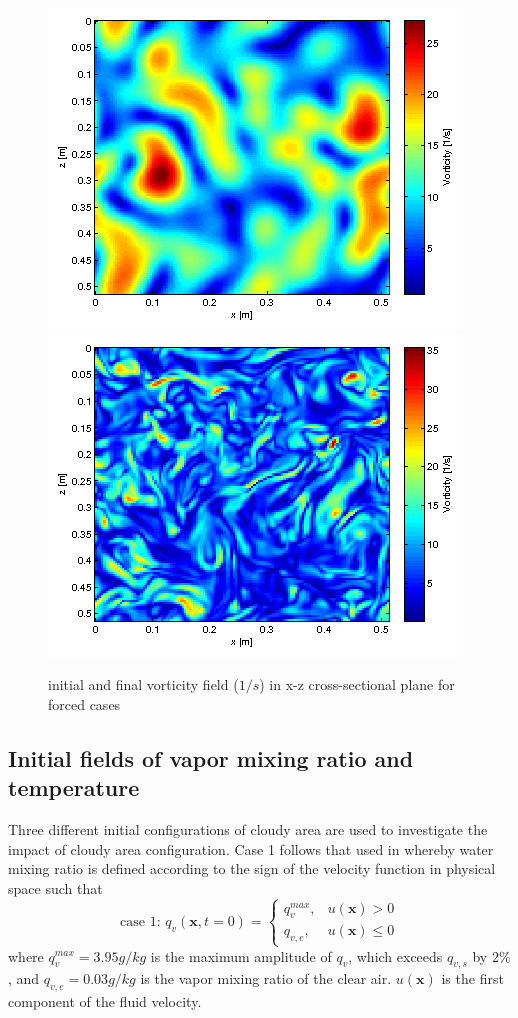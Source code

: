 \documentclass[draft,jgrga]{AGUTeX}
\begin{document}
\begin{article}

\begin{figure}[H]\centering
\includegraphics[width=0.48\linewidth]{Figures/vortex-0}
\includegraphics[width=0.48\linewidth]{Figures/vortex-1}

\caption{initial and final vorticity field ($1/s$) in x-z cross-sectional
plane for forced cases\label{fig:enstrophy}}
\end{figure}

\subsection{Initial fields of vapor mixing ratio and temperature}
Three different initial configurations of cloudy area are used to investigate the impact of cloudy area configuration. Case 1 follows that used in \cite{And04} whereby water mixing ratio is defined according to the sign of the velocity function in physical space such that
\begin{equation}
\mbox{case 1: } q_v(\mathbf{x},t=0) = 
\left\{\begin{array}{lr}
q_v^{max}, & u(\mathbf{x}) > 0\\
q_{v,e}, & u(\mathbf{x}) \le 0
\end{array}\right.\label{case1}
\end{equation}
where $q_v^{max} = 3.95 g/kg$ is the maximum amplitude of $q_v$, which exceeds $q_{v,s}$ by $2\%$, and $q_{v,e} = 0.03g/kg$ is the vapor mixing ratio of the clear air. $u(\mathbf{x})$ is the first component of the fluid velocity. 


\end{article}
\end{document}
